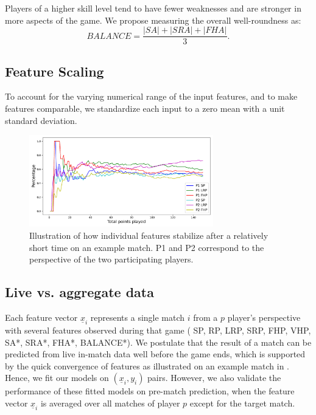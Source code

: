 Players of a higher skill level tend to have fewer weaknesses and are stronger in more aspects of the game. We propose measuring the overall well-roundness as:
\begin{equation}
    \textit{BALANCE} = \frac{|\textit{SA}|+|\textit{SRA}|+|\textit{FHA}|}{3}.
\end{equation}


\subsection{Feature Scaling}
To account for the varying numerical range of the input features, and to make features comparable, we standardize each input to a zero mean with a unit standard deviation.

\begin{figure}[b]
\centering
\includegraphics[width=8cm]{plots/featuresandtime.pdf}
\caption{Illustration of how individual features stabilize after a relatively short time on an example match. P1 and P2 correspond to the perspective of the two participating players.}
\label{fig:time}
\end{figure}

\subsection{Live vs. aggregate data}

Each feature vector $\underline{x}_i$ represents a single match $i$ from a $p$ player's perspective with several features observed during that game ( SP, RP, LRP, SRP, FHP, VHP, SA*, SRA*, FHA*, BALANCE*). We postulate that the result of a match can be predicted from live in-match data well before the game ends, which is supported by the quick convergence of features as illustrated on an example match in . Hence, we fit our models on $(\underline{x}_i,y_i)$ pairs. However, we also validate the performance of these fitted models on pre-match prediction, when the feature vector $\underline{x}_i$ is averaged over all matches of player $p$ except for the target match.


